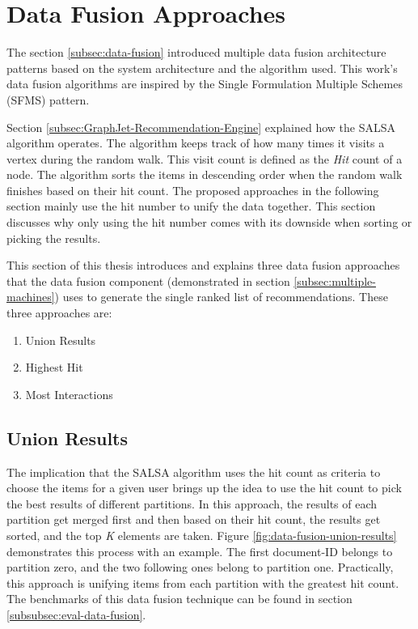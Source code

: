 \section{Data Fusion Approaches}
\label{sec:data-fusion-approaches}
The section \ref{subsec:data-fusion} introduced multiple data fusion architecture patterns based on the system architecture and the algorithm used. This work's data fusion algorithms are inspired by the Single Formulation Multiple Schemes (SFMS) pattern. 

Section \ref{subsec:GraphJet-Recommendation-Engine} explained how the SALSA algorithm operates. The algorithm keeps track of how many times it visits a vertex during the random walk. This visit count is defined as the \emph{Hit} count of a node. The algorithm sorts the items in descending order when the random walk finishes based on their hit count. The proposed approaches in the following section mainly use the hit number to unify the data together. This section discusses why only using the hit number comes with its downside when sorting or picking the results.


This section of this thesis introduces and explains three data fusion approaches that the data fusion component (demonstrated in section \ref{subsec:multiple-machines}) uses to generate the single ranked list of recommendations. These three approaches are:

\begin{enumerate}
    \item Union Results
    \item Highest Hit
    \item Most Interactions
\end{enumerate}

\subsection{Union Results}
\label{subsec:data-fusion-union-results}
The implication that the SALSA algorithm uses the hit count as criteria to choose the items for a given user brings up the idea to use the hit count to pick the best results of different partitions.
In this approach, the results of each partition get merged first and then based on their hit count, the results get sorted, and the top \emph{K} elements are taken. Figure \ref{fig:data-fusion-union-results} demonstrates this process with an example. The first document-ID belongs to partition zero, and the two following ones belong to partition one. Practically, this approach is unifying items from each partition with the greatest hit count. The benchmarks of this data fusion technique can be found in section \ref{subsubsec:eval-data-fusion}. 



